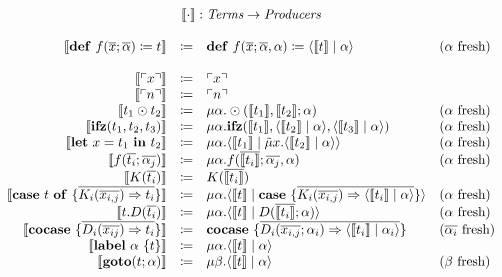 \[
  \begin{array}{rcll}
    \multicolumn{4}{c}{\translate{\cdot} : \emph{Terms} \rightarrow \emph{Producers}}\\
    \\
    \translate{\defi{f(\overline{x}; \overline{\alpha})}{t}} & \coloneq & \defi{f(\overline{x}; \overline{\alpha}, \alpha)}{\cut{\translate{t}}{\alpha}} & \fresh{\alpha}\\
  \quad \\
    \translate{\lit{x}} & \coloneq & \lit{x} & \\
    \translate{\lit{n}} & \coloneq & \lit{n} & \\
    \translate{t_1 \odot t_2} & \coloneq & \mu\alpha.\odot(\translate{t_1}, \translate{t_2}; \alpha) & \fresh{\alpha}\\
    \translate{\ifz{t_1}{t_2}{t_3}} & \coloneq & \mu\alpha.\ifz{\translate{t_1}}{\cut{\translate{t_2}}{\alpha}}{\cut{\translate{t_3}}{\alpha}} & \fresh{\alpha}\\
    \translate{\letin{x}{t_1}{t_2}} & \coloneq & \mu\alpha.\cut{\translate{t_1}}{\tilde{\mu}x.\cut{\translate{t_2}}{\alpha}} & \fresh{\alpha}\\
    \translate{f(\overline{t_i}; \overline{\alpha_j})} & \coloneq & \mu\alpha.f(\overline{\translate{t_i}}; \overline{\alpha_j},\alpha) & \fresh{\alpha}\\
    \translate{K(\overline{t_i})} & \coloneq & K(\overline{\translate{t_i}}) & \\
    \translate{\caseof{t}{\overline{K_i(\overline{x_{i,j}}) \Rightarrow t_i}}} & \coloneq & \mu\alpha.\cut{\translate{t}}{\case{\overline{K_i(\overline{x_{i,j}}) \Rightarrow \cut{\translate{t_i}}{\alpha}}}} & \fresh{\alpha}\\
    \translate{t.D(\overline{t_i})} & \coloneq & \mu\alpha.\cut{\translate{t}}{D(\overline{\translate{t_i}}; \alpha)} & \fresh{\alpha}\\
    \translate{\cocase{\overline{D_i(\overline{x_{ij}})\Rightarrow t_i}}} & \coloneq & \cocase{\overline{D_i(\overline{x_{i,j}}; \alpha_i) \Rightarrow \cut{\translate{t_i}}{\alpha_i}}} & \fresh{\overline{\alpha_i}}\\
    \translate{\lab{\alpha}{t}} & \coloneq & \mu\alpha.\cut{\translate{t}}{\alpha} & \\
    \translate{\goto{t}{\alpha}} & \coloneq & \mu\beta.\cut{\translate{t}}{\alpha} & \fresh{\beta}
  \end{array}
\]

